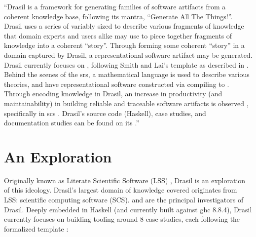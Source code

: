 
\begin{mdleftbar}
      ``Drasil is a framework for generating families of software artifacts from
      a coherent knowledge base, following its mantra, ``Generate All The
      Things!''. Drasil uses a series of variably sized  to describe
      various fragments of knowledge that domain experts and users alike may use
      to piece together fragments of knowledge into a coherent ``story''.
      Through forming some coherent ``story'' in a domain captured by Drasil, a
      representational software artifact may be generated. Drasil currently
      focuses on , following Smith and Lai's  template as
      described in \cite{SmithAndLai2005}. Behind the scenes of the \acs{srs}, a
      mathematical language is used to describe various theories, and have
      representational software constructed via compiling to 
      \cite{Carette2019}. Through encoding knowledge in Drasil, an increase in
      productivity (and maintainability) in building reliable and traceable
      software artifacts is observed \cite{SzymczakEtAl2016}, specifically in
      \acs{scs} \cite{Smith2018}. Drasil's source code (Haskell), case studies,
      and documentation studies can be found on its
      .''
      \cite{Balaci2021Poster}
\end{mdleftbar}

\section{An Exploration}

Originally known as Literate Scientific Software (LSS) , Drasil is an
exploration of this ideology. Drasil's largest domain of knowledge covered
originates from LSS: scientific computing software (SCS).  and  are the principal investigators of
Drasil. Deeply embedded in Haskell  (and currently built against
\acs{ghc}  8.8.4), Drasil currently focuses on building tooling around
8 case studies, each following the formalized  template
\cite{SmithAndLai2005}:


